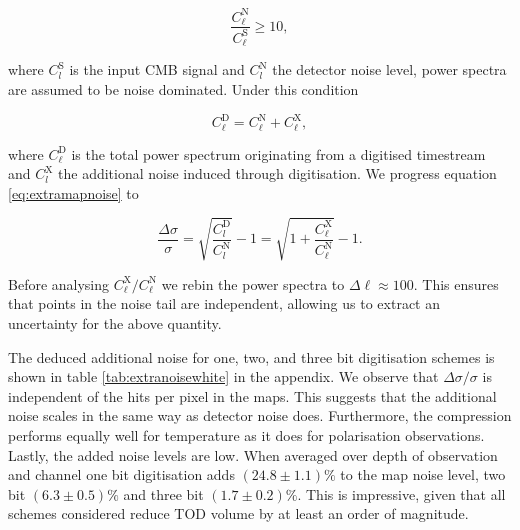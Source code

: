 \documentclass[apj]{emulateapj}
\begin{document}
\begin{equation} \frac{C_\ell^{\mathrm{N}}}{C_\ell^{\mathrm{S}}} \geq 10, \end{equation}

where $C_l^\mathrm{S}$ is the input CMB signal and $C_l^\mathrm{N}$ the detector noise level, power spectra are assumed to be noise dominated. Under this condition

\begin{equation} C_{\ell}^\mathrm{D} = C_\ell^\mathrm{N} + C_\ell^\mathrm{X}, \end{equation}

where $C_\ell^\mathrm{D}$ is the total power spectrum originating from a digitised timestream and $C_l^\mathrm{X}$ the additional noise induced through digitisation. We progress equation \ref{eq:extramapnoise} to

\begin{equation}\frac{\Delta \sigma}{\sigma} = \sqrt{\frac{C_l^\mathrm{D}}{C_l^{\mathrm{N}}}} - 1 = \sqrt{1 + \frac{C_\ell^\mathrm{X}}{C_\ell^{\mathrm{N}}}} - 1. \end{equation}

Before analysing $C_\ell^\mathrm{X}/C_\ell^\mathrm{N}$ we rebin the power spectra to $\Delta \ell \approx 100$. This ensures that points in the noise tail are independent, allowing us to extract an uncertainty for the above quantity.

The deduced additional noise for one, two, and three bit digitisation schemes is shown in table \ref{tab:extranoisewhite} in the appendix. We observe that $\Delta \sigma / \sigma$ is independent of the hits per pixel in the maps. This suggests that the additional noise scales in the same way as detector noise does. Furthermore, the compression performs equally well for temperature as it does for polarisation observations. Lastly, the added noise levels are low. When averaged over depth of observation and channel one bit digitisation adds $(24.8\pm 1.1)\%$ to the map noise level, two bit $(6.3\pm0.5)\%$ and three bit $(1.7\pm0.2)\%$. This is impressive, given that all schemes considered reduce TOD volume by at least an order of magnitude.

\end{document}
